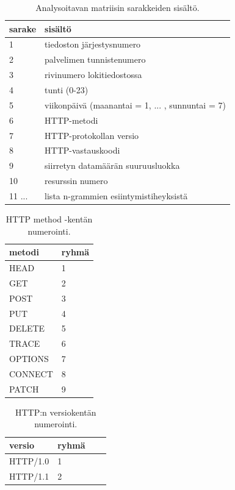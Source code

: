 \begin{table}[p]
\centering
\begin{tabular}{l|l}
sarake & sisältö \\
\hline

1 & tiedoston järjestysnumero \\
2 & palvelimen tunnistenumero \\
3 & rivinumero lokitiedostossa \\
4 & tunti (0-23) \\
5 & viikonpäivä (maanantai = 1, ... , sunnuntai = 7) \\
6 & HTTP-metodi \\
7 & HTTP-protokollan versio \\
8 & HTTP-vastauskoodi \\
9 & siirretyn datamäärän suuruusluokka \\
10 & resurssin numero \\
11 ... & lista n-grammien esiintymistiheyksistä \\

\end{tabular}
\caption{Analysoitavan matriisin sarakkeiden sisältö.}
\label{matriisi}
\end{table}

\begin{table}[p]
\centering
\begin{tabular}{ll}
metodi & ryhmä \\
\hline
HEAD & 1 \\
GET & 2 \\
POST & 3 \\
PUT & 4 \\
DELETE & 5 \\
TRACE & 6 \\
OPTIONS & 7 \\
CONNECT & 8 \\
PATCH & 9 \\

\end{tabular}
\caption{HTTP method -kentän numerointi.}
\label{metodi}
\end{table}

\begin{table}[p]
\centering
\begin{tabular}{llll}
versio & ryhmä \\
\hline
HTTP/1.0 & 1 \\
HTTP/1.1 & 2 \\
\end{tabular}
\caption{ HTTP:n versiokentän numerointi.}
\label{httpversio}
\end{table}

